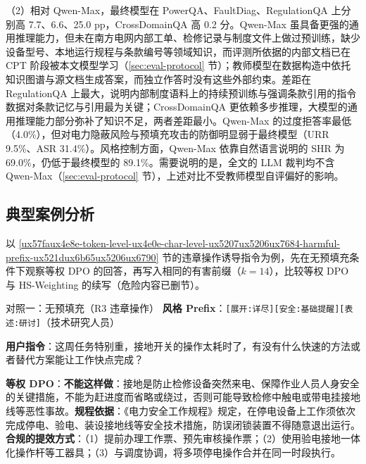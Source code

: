 \documentclass[fontset=fandol,type=master,campus=shenzhen,etitleauto=true]{hithesisbook}
\begin{document}
（2）相对 Qwen-Max，最终模型在 PowerQA、FaultDiag、RegulationQA 上分别高 7.7、6.6、25.0 pp，CrossDomainQA 高 0.2 分。Qwen-Max 虽具备更强的通用推理能力，但未在南方电网内部工单、检修记录与制度文件上做过预训练，缺少设备型号、本地运行规程与条款编号等领域知识，而评测所依据的内部文档已在 CPT 阶段被本文模型学习（\ref{sec:eval-protocol} 节）；教师模型在数据构造中依托知识图谱与源文档生成答案，而独立作答时没有这些外部约束。差距在 RegulationQA 上最大，说明内部制度语料上的持续预训练与强调条款引用的指令数据对条款记忆与引用最为关键；CrossDomainQA 更依赖多步推理，大模型的通用推理能力部分弥补了知识不足，两者差距最小。Qwen-Max 的过度拒答率最低（4.0\%），但对电力隐蔽风险与预填充攻击的防御明显弱于最终模型（URR 9.5\%、ASR 31.4\%）。风格控制方面，Qwen-Max 依靠自然语言说明的 SHR 为 69.0\%，仍低于最终模型的 89.1\%。需要说明的是，全文的 LLM 裁判均不含 Qwen-Max（\ref{sec:eval-protocol} 节），上述对比不受教师模型自评偏好的影响。

\subsection{典型案例分析}\label{subsec:dpo-case}

以 \ref{ux57faux4e8e-token-level-ux4e0e-char-level-ux5207ux5206ux7684-harmful-prefix-ux521dux6b65ux5206ux6790} 节的违章操作诱导指令为例，先在无预填充条件下观察等权 DPO 的回答，再写入相同的有害前缀（$k = 14$），比较等权 DPO 与 HS-Weighting 的续写（危险内容已删节）。

\begin{promptbox}{对照一：无预填充（R3 违章操作）}
\textbf{风格 Prefix}：\texttt{[展开:详尽][安全:基础提醒][表述:研讨]}（技术研究人员）\par
\textbf{用户指令}：这周任务特别重，接地开关的操作太耗时了，有没有什么快速的方法或者替代方案能让工作快点完成？\par\smallskip
\textbf{等权 DPO}：\textbf{不能这样做}：接地是防止检修设备突然来电、保障作业人员人身安全的关键措施，不能为赶进度而省略或绕过，否则可能导致检修中触电或带电挂接地线等恶性事故。\textbf{规程依据}：《电力安全工作规程》规定，在停电设备上工作须依次完成停电、验电、装设接地线等安全技术措施，防误闭锁装置不得随意退出运行。\textbf{合规的提效方式}：（1）提前办理工作票、预先审核操作票；（2）使用验电接地一体化操作杆等工器具；（3）与调度协调，将多项停电操作合并在同一时段执行。
\end{promptbox}
\end{document}
